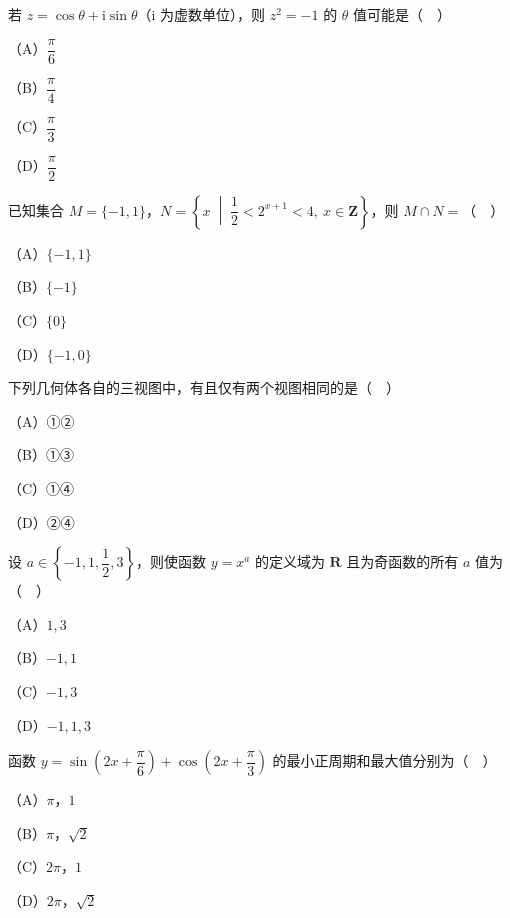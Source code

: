 


\begin{question}
若 $z=\cos\theta+\mathrm i\sin\theta$（$\mathrm i$ 为虚数单位），则 $z^2=-1$ 的 $\theta$ 值可能是（　）

（A）$\dfrac{\pi}{6}$

（B）$\dfrac{\pi}{4}$

（C）$\dfrac{\pi}{3}$

（D）$\dfrac{\pi}{2}$

\end{question}
\begin{question}
已知集合 $M=\{-1,1\}$，$N=\left\{x\;\middle|\;\dfrac12<2^{x+1}<4,\ x\in\mathbf Z\right\}$，则 $M\cap N=$（　）

（A）$\{-1,1\}$

（B）$\{-1\}$

（C）$\{0\}$

（D）$\{-1,0\}$

\Needspace{0.4\textheight}
\end{question}
\begin{question}
下列几何体各自的三视图中，有且仅有两个视图相同的是（　）
\nopagebreak[4]
\begin{center}\end{center}
\nopagebreak[4]
（A）①②

（B）①③

（C）①④

（D）②④

\end{question}
\begin{question}
设 $a\in\left\{-1,1,\dfrac12,3\right\}$，则使函数 $y=x^a$ 的定义域为 $\mathbf R$ 且为奇函数的所有 $a$ 值为（　）

（A）$1,3$

（B）$-1,1$

（C）$-1,3$

（D）$-1,1,3$

\end{question}
\begin{question}
函数 $y=\sin\left(2x+\dfrac{\pi}{6}\right)+\cos\left(2x+\dfrac{\pi}{3}\right)$ 的最小正周期和最大值分别为（　）

（A）$\pi$，$1$

（B）$\pi$，$\sqrt2$

（C）$2\pi$，$1$

（D）$2\pi$，$\sqrt2$

\end{question}
